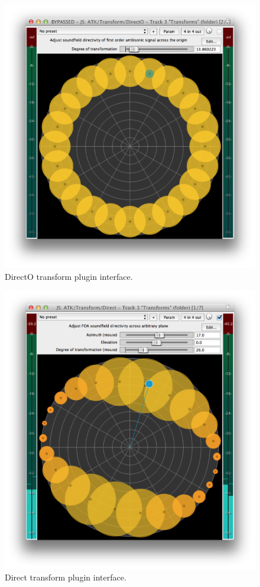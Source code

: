 \documentclass{article}
\begin{document}
\begin{figure}[h]
\centering
\includegraphics[width=0.9\columnwidth]{figures/directOTransform.png}
\caption{DirectO transform plugin interface.\label{fig:directOTransform}}
\end{figure}


\begin{figure}[h]
\centering
\includegraphics[width=0.9\columnwidth]{figures/directTransform.png}
\caption{Direct transform plugin interface.\label{fig:directTransform}}
\end{figure}
\end{document}
